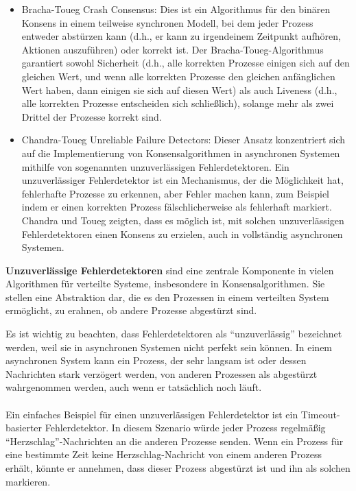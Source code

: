 \begin{itemize}
\item Bracha-Toueg Crash Consensus: Dies ist ein Algorithmus für den binären Konsens in einem teilweise synchronen Modell, bei dem jeder Prozess entweder abstürzen kann (d.h., er kann zu irgendeinem Zeitpunkt aufhören, Aktionen auszuführen) oder korrekt ist. Der Bracha-Toueg-Algorithmus garantiert sowohl Sicherheit (d.h., alle korrekten Prozesse einigen sich auf den gleichen Wert, und wenn alle korrekten Prozesse den gleichen anfänglichen Wert haben, dann einigen sie sich auf diesen Wert) als auch Liveness (d.h., alle korrekten Prozesse entscheiden sich schließlich), solange mehr als zwei Drittel der Prozesse korrekt sind.
\item Chandra-Toueg Unreliable Failure Detectors: Dieser Ansatz konzentriert sich auf die Implementierung von Konsensalgorithmen in asynchronen Systemen mithilfe von sogenannten unzuverlässigen Fehlerdetektoren. Ein unzuverlässiger Fehlerdetektor ist ein Mechanismus, der die Möglichkeit hat, fehlerhafte Prozesse zu erkennen, aber Fehler machen kann, zum Beispiel indem er einen korrekten Prozess fälschlicherweise als fehlerhaft markiert. Chandra und Toueg zeigten, dass es möglich ist, mit solchen unzuverlässigen Fehlerdetektoren einen Konsens zu erzielen, auch in vollständig asynchronen Systemen.
\end{itemize}    
\textbf{Unzuverlässige Fehlerdetektoren} sind eine zentrale Komponente in vielen Algorithmen für verteilte Systeme, insbesondere in Konsensalgorithmen. Sie stellen eine Abstraktion dar, die es den Prozessen in einem verteilten System ermöglicht, zu erahnen, ob andere Prozesse abgestürzt sind.

Es ist wichtig zu beachten, dass Fehlerdetektoren als \enquote{unzuverlässig} bezeichnet werden, weil sie in asynchronen Systemen nicht perfekt sein können. In einem asynchronen System kann ein Prozess, der sehr langsam ist oder dessen Nachrichten stark verzögert werden, von anderen Prozessen als abgestürzt wahrgenommen werden, auch wenn er tatsächlich noch läuft.
\\\\
Ein einfaches Beispiel für einen unzuverlässigen Fehlerdetektor ist ein Timeout-basierter Fehlerdetektor. In diesem Szenario würde jeder Prozess regelmäßig \enquote{Herzschlag}-Nachrichten an die anderen Prozesse senden. Wenn ein Prozess für eine bestimmte Zeit keine Herzschlag-Nachricht von einem anderen Prozess erhält, könnte er annehmen, dass dieser Prozess abgestürzt ist und ihn als solchen markieren.

